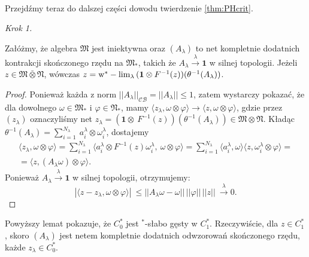 \paragraph{}
Przejdźmy teraz do dalszej części dowodu twierdzenie \ref{thm:PHcrit}.

{\it Krok 1.}
\begin{Lemma}
\label{lem:netinvNalg}
Załóżmy, że algebra $\mathfrak{M}$ jest iniektywna oraz
$(A_{\lambda})$ to net kompletnie dodatnich kontrakcji skończonego rzędu na
$\mathfrak{M}_{*}$, takich że
$A_{\lambda} \stackrel{\lambda}{\rightarrow} \mathbf{1}$ w silnej topologii.
Jeżeli $z \in \mathfrak{M} \bar{\otimes} \mathfrak{N}$, wówczas
$z = {\rm w}^*-\lim_{\lambda} \, (\mathbf{1} \otimes F^{-1}(z) )
(\theta^{-1} (A_{\lambda}))$.
\end{Lemma}
\begin{proof}
Ponieważ każda z norm $||A_{\lambda}||_{\mathcal{CB}} = || A_{\lambda} ||  \leq 1$,
zatem wystarczy pokazać, że dla dowolnego $\omega \in \mathfrak{M}_{*}$
i $\varphi \in \mathfrak{N}_{*}$,
mamy
$\langle z_{\lambda}, \omega \otimes \varphi\rangle{\longrightarrow}
\langle z , \omega \otimes \varphi\rangle$,
gdzie przez $(z_{\lambda})$ oznaczyliśmy net $z_{\lambda} = (\mathbf{1} \otimes \
F^{-1}(z))(\theta^{-1}(A_{\lambda})) \in \mathfrak{M} \otimes \mathfrak{N}$.
Kładąc
$\theta^{-1}(A_{\lambda}) = \sum_{i=1}^{N_{\lambda}} \
a_{i}^{\lambda} \otimes \omega_{i}^{\lambda}$, dostajemy
\begin{multline}
\langle z_{\lambda}, \omega \otimes \varphi\rangle =
\sum \limits_{i=1}^{N_{\lambda}}
\langle a_{i}^{\lambda} \otimes F^{-1}(z) \omega_{i}^{\lambda} ,\
\omega \otimes \varphi \rangle
= \sum \limits_{i=1}^{N_{\lambda}}
\langle  a_{i}^{\lambda}, \omega \rangle
\langle z,  \omega_{i}^{\lambda} \otimes \varphi \rangle = \\
= \langle z , (A_{\lambda} \omega) \otimes \varphi \rangle.
\end{multline}
Ponieważ $A_{\lambda} \stackrel{\lambda}{\rightarrow} \mathbf{1}$ w silnej topologii,
otrzymujemy:
\begin{equation}
| \langle z - z_{\lambda}, \omega\otimes \varphi \rangle | \
\leq || A_{\lambda} \omega - \omega || \, ||\varphi|| \, ||z|| \
\stackrel{\lambda}{\longrightarrow} 0.
\end{equation}
\end{proof}

\begin{Corollary}
\label{cor:denseness}
Powyższy lemat pokazuje, że $C_0^*$ jest $^{*}$-słabo gęsty w $C_1^*$.
Rzeczywiście, dla
$z \in C_{1}^{*}$, skoro $(A_{\lambda})$ jest netem kompletnie dodatnich
odwzorowań skończonego rzędu, każde $z_{\lambda} \in C_{0}^{*}$.
\end{Corollary}

